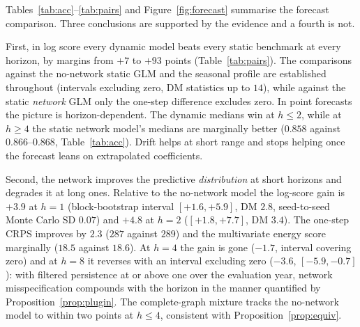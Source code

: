 \documentclass[12pt]{article}
\theoremstyle{plain}
\theoremstyle{definition}
\theoremstyle{remark}
\begin{document}
Tables~\ref{tab:acc}--\ref{tab:pairs} and Figure~\ref{fig:forecast} summarise the forecast comparison. Three conclusions are supported by the evidence and a fourth is not.

First, in log score every dynamic model beats every static benchmark at every horizon, by margins from $+7$ to $+93$ points (Table~\ref{tab:pairs}). The comparisons against the no-network static GLM and the seasonal profile are established throughout (intervals excluding zero, DM statistics up to $14$), while against the static \emph{network} GLM only the one-step difference excludes zero. In point forecasts the picture is horizon-dependent. The dynamic medians win at $h\le2$, while at $h\ge4$ the static network model's medians are marginally better ($0.858$ against $0.866$--$0.868$, Table~\ref{tab:acc}). Drift helps at short range and stops helping once the forecast leans on extrapolated coefficients.

Second, the network improves the predictive \emph{distribution} at short horizons and degrades it at long ones. Relative to the no-network model the log-score gain is $+3.9$ at $h=1$ (block-bootstrap interval $[+1.6,+5.9]$, DM $2.8$, seed-to-seed Monte Carlo SD $0.07$) and $+4.8$ at $h=2$ ($[+1.8,+7.7]$, DM $3.4$). The one-step CRPS improves by $2.3$ ($287$ against $289$) and the multivariate energy score marginally ($18.5$ against $18.6$). At $h=4$ the gain is gone ($-1.7$, interval covering zero) and at $h=8$ it reverses with an interval excluding zero ($-3.6$, $[-5.9,-0.7]$): with filtered persistence at or above one over the evaluation year, network misspecification compounds with the horizon in the manner quantified by Proposition~\ref{prop:plugin}. The complete-graph mixture tracks the no-network model to within two points at $h\le4$, consistent with Proposition~\ref{prop:equiv}.
\end{document}
